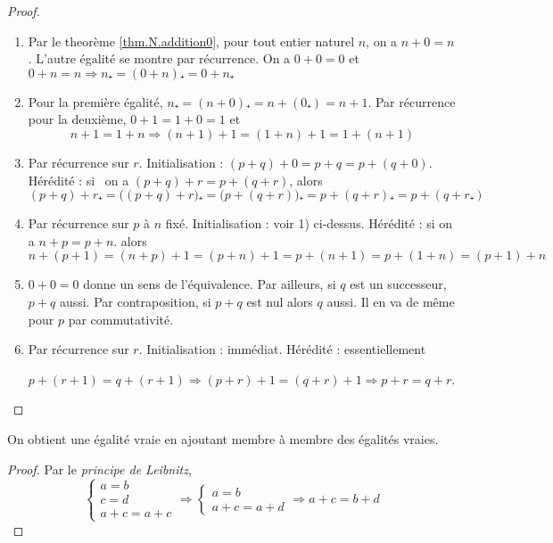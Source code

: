 \begin{proof}
\par\noindent
%
\begin{enumerate}
\item Par le theorème \ref{thm.N.addition0}, pour tout entier naturel \(𝑛\), on a
 \(𝑛+0=𝑛\). L'autre égalité se montre par récurrence.
 On a \(0+0=0\) et
 \(0+𝑛=𝑛⇒𝑛₊=(0+𝑛)₊=0+𝑛₊\)
%
\item Pour la première égalité, \(𝑛₊=(𝑛+0)₊=𝑛+(0₊)=𝑛+1\). Par récurrence pour la deuxième, \(0+1=1+0=1\) et
%
\begin{equation*}
𝑛+1=1+𝑛⇒(𝑛+1)+1=(1+𝑛)+1=1+(𝑛+1)
\end{equation*}
\item Par récurrence sur \(𝑟\). Initialisation : \((𝑝+𝑞)+0=𝑝+𝑞=𝑝+(𝑞+0)\). Hérédité : si \ on a 
\((𝑝+𝑞)+𝑟=𝑝+(𝑞+𝑟)\), alors
%
\begin{equation*}
(𝑝+𝑞)+𝑟₊=\bigl((𝑝+𝑞)+𝑟\bigr)₊=\bigl(𝑝+(𝑞+𝑟)\bigr)₊=𝑝+(𝑞+𝑟)₊=𝑝+(𝑞+𝑟₊)
\end{equation*}
\item Par récurrence sur \(𝑝\) à \(𝑛\) fixé. Initialisation : voir 1) ci-dessus. Hérédité : si on a \(𝑛+𝑝=𝑝+𝑛\). alors
%
\begin{equation*}
𝑛+(𝑝+1)=(𝑛+𝑝)+1=(𝑝+𝑛)+1=𝑝+(𝑛+1)=𝑝+(1+𝑛)=(𝑝+1)+𝑛
\end{equation*}
\item \(0+0=0\) donne un sens de l'équivalence. Par ailleurs, si \(𝑞\) est un successeur, \(𝑝+𝑞\) aussi. Par
contraposition, si \(𝑝+𝑞\) est nul alors \(𝑞\) aussi. Il en va de même pour \(𝑝\) par commutativité.
\item Par récurrence sur \(𝑟\). Initialisation : immédiat. Hérédité : essentiellement

 \(𝑝+(𝑟+1)=𝑞+(𝑟+1)⇒(𝑝+𝑟)+1=(𝑞+𝑟)+1⇒𝑝+𝑟=𝑞+𝑟\).
\end{enumerate}
\end{proof}
%
\begin{proposition} 
On obtient une égalité vraie en ajoutant membre à membre des égalités vraies.
\end{proposition}
%
\begin{proof}
Par le \emph{principe de Leibnitz},
\begin{equation*}
\begin{cases}
𝑎=𝑏\\𝑐=𝑑\\𝑎+𝑐=𝑎+𝑐
\end{cases}⇒\begin{cases}
𝑎=𝑏\\𝑎+𝑐=𝑎+𝑑
\end{cases}⇒𝑎+𝑐=𝑏+𝑑
\end{equation*}
\end{proof}
%
